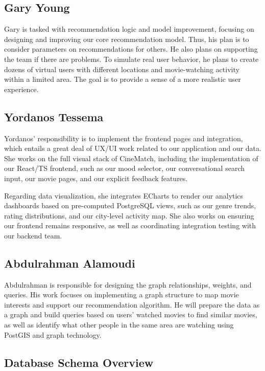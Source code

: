\documentclass[conference]{IEEEtran}
\begin{document}
\subsection*{Gary Young}
Gary is tasked with recommendation logic and model improvement, focusing on designing and improving our core recommendation model. Thus, his plan is to consider parameters on recommendations for others. He also plans on supporting the team if there are problems. To simulate real user behavior, he plans to create dozens of virtual users with different locations and movie-watching activity within a limited area. The goal is to provide a sense of a more realistic user experience.

\subsection*{Yordanos Tessema}
Yordanos' responsibility is to implement the frontend pages and integration, which entails a great deal of UX/UI work related to our application and our data. She works on the full visual stack of CineMatch, including the implementation of our React/TS frontend, such as our mood selector, our conversational search input, our movie pages, and our explicit feedback features.

Regarding data visualization, she integrates ECharts to render our analytics dashboards based on pre-computed PostgreSQL views, such as our genre trends, rating distributions, and our city-level activity map. She also works on ensuring our frontend remains responsive, as well as coordinating integration testing with our backend team.

\subsection*{Abdulrahman Alamoudi}
Abdulrahman is responsible for designing the graph relationships, weights, and queries. His work focuses on implementing a graph structure to map movie interests and support our recommendation algorithm. He will prepare the data as a graph and build queries based on users’ watched movies to find similar movies, as well as identify what other people in the same area are watching using PostGIS and graph technology. 


\subsection*{Database Schema Overview}
\end{document}
